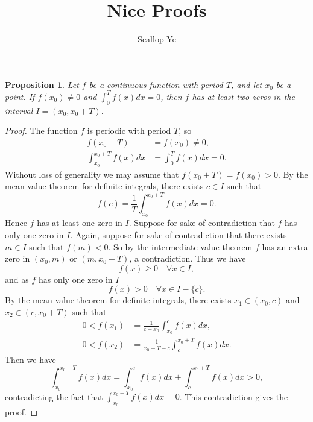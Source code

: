 \documentclass{amsart}
\title{Nice Proofs}
\author{Scallop Ye}
\newtheorem{proposition}{Proposition}
\begin{document}
\maketitle

\begin{proposition}
    Let $f$ be a continuous function with period $T$, and let $x_0$ be a point.
    If $f(x_0)\neq0$ and $\int_{0}^{T}f(x)dx=0$, then $f$ has
    at least two zeros in the interval $I=(x_0,x_0+T)$.
\end{proposition}

\begin{proof}
    The function $f$ is periodic with period $T$, so
    \begin{align*}
        f(x_0+T)                 & =f(x_0)\neq0,          \\
        \int_{x_0}^{x_0+T}f(x)dx & =\int_{0}^{T}f(x)dx=0.
    \end{align*}
    Without loss of generality we may assume that $f(x_0+T)=f(x_0)>0$.
    By the mean value theorem for definite integrals, there exists $c\in I$ such that
    \[f(c)=\frac{1}{T}\int_{x_0}^{x_0+T}f(x)dx=0.\]
    Hence $f$ has at least one zero in $I$. Suppose for sake of contradiction that
    $f$ has only one zero in $I$. Again, suppose for sake of contradiction that
    there exists $m\in I$ such that $f(m)<0$. So by the intermediate value theorem
    $f$ has an extra zero in $(x_0,m)$ or $(m,x_0+T)$, a contradiction. Thus we have
    \[f(x)\ge0\quad\forall x\in I,\]
    and as $f$ has only one zero in $I$
    \[f(x)>0 \quad\forall x\in I-\{c\}.\]
    By the mean value theorem for definite integrals, there exists $x_1\in(x_0,c)$ and
    $x_2\in(c,x_0+T)$ such that
    \begin{align*}
        0<f(x_1) & =\frac{1}{c-x_0}\int_{x_0}^{c}f(x)dx,     \\
        0<f(x_2) & =\frac{1}{x_0+T-c}\int_{c}^{x_0+T}f(x)dx.
    \end{align*}
    Then we have
    \[\int_{x_0}^{x_0+T}f(x)dx=\int_{x_0}^{c}f(x)dx+\int_{c}^{x_0+T}f(x)dx>0,\]
    contradicting the fact that $\int_{x_0}^{x_0+T}f(x)dx=0$. This contradiction gives the proof.
\end{proof}
\end{document}

